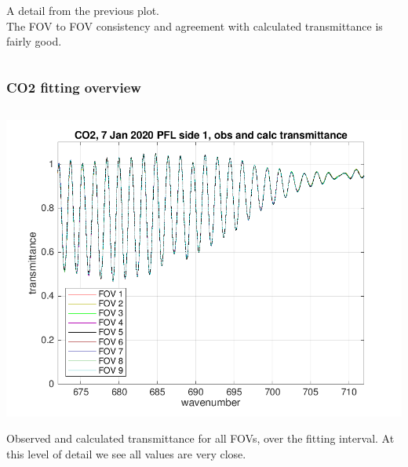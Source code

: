 \documentclass[10pt]{beamer}
\begin{document}
\begin{frame}
\begin{columns}[t]
\begin{column}{0.5\textwidth}
A detail from the previous plot. \\ The FOV to FOV consistency and
agreement with calculated transmittance is fairly good.

\end{column}
\end{columns}
\end{frame}
\begin{frame}
\frametitle{CO2 fitting overview}
\begin{columns}[t]
\begin{column}{0.5\textwidth}  
  \begin{centering}
  \includegraphics[width=\textwidth]{figures/CO2_obs_and_calc.png}
  \end{centering}\vspace{3mm}

Observed and calculated transmittance for all FOVs, over the fitting
interval.  At this level of detail we see all values are very close.

\end{column}


\end{columns}
\end{frame}
\end{document}
